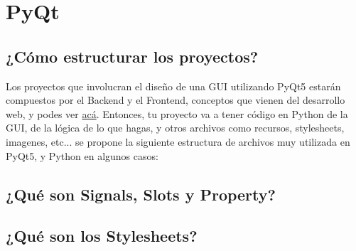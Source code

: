 \section{PyQt}

\subsection{¿C\'omo estructurar los proyectos?}
\label{estructura_programas}
Los proyectos que involucran el dise\~no de una GUI utilizando PyQt5 estar\'an compuestos por el Backend y el Frontend, conceptos
que vienen del desarrollo web, y podes ver \href{https://platzi.com/blog/que-es-frontend-y-backend/}{ac\'a}. Entonces, tu proyecto va a tener
c\'odigo en Python de la GUI, de la l\'ogica de lo que hagas, y otros archivos como recursos, stylesheets, imagenes, etc... se propone la siguiente
estructura de archivos muy utilizada en PyQt5, y Python en algunos casos:

\begin{center}
    \begin{minipage}{10cm}
    \end{minipage}
\end{center}

\subsection{¿Qu\'e son Signals, Slots y Property?}
\label{signal_slot_property}

\subsection{¿Qu\'e son los Stylesheets?}
\label{qt_stylesheets}